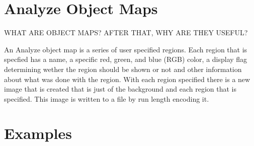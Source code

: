 \documentclass{InsightArticle}
\begin{document}
\section{Analyze Object Maps}

WHAT ARE OBJECT MAPS?  AFTER THAT, WHY ARE THEY USEFUL?

An Analyze object map is a series of user specified regions.  Each region that is specfied has a name, a specific red, green, and blue (RGB) color, a display flag determining wether the region should be shown or not and other information about what was done with the region.  With each region
specified there is a new image that is created that is just of the background and each region that is specified.  This image is written to a file by run length encoding it.



\section{Examples}
\end{document}
